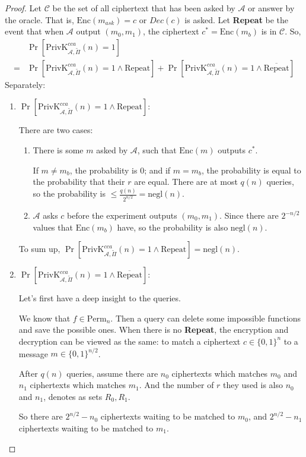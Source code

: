 \documentclass[12pt]{article}
\newcommand{\privk}{\text{PrivK}}
\newcommand{\negl}{\text{negl}}
\newcommand{\Enc}{\text{Enc}}
\newcommand{\Perm}{\text{Perm}}
\newcommand{\Repeat}{\text{Repeat}}
\newcommand{\C}{\mathcal{C}}
\newcommand{\A}{\mathcal{A}}
\newenvironment{problem}[2][Problem]{\begin{trivlist}
\item[\hskip \labelsep {\bfseries #1}\hskip \labelsep {\bfseries #2.}]}{\end{trivlist}}
\begin{document}
\begin{problem}{4.25}
\begin{proof}
Let $\C$ be the set of all ciphertext that has been asked by $\A$ or answer by the oracle. That is, $\Enc(m_{ask}) = c$ or $Dec(c)$ is asked. Let \textbf{Repeat} be the event that when $\A$ output $(m_0,m_1)$, the ciphertext $c^* = \Enc(m_b)$ is in $\C$. So,
\begin{align*}
    &\Pr[\privk_{\A,\widetilde{\Pi}}^{cca}(n)=1]\\
    =&\Pr[\privk_{\A,\widetilde{\Pi}}^{cca}(n)=1\land\Repeat]+\Pr[\privk_{\A,\widetilde{\Pi}}^{cca}(n)=1\land\overline{\Repeat}]
\end{align*}
Separately:
\begin{enumerate}
    \item $\Pr[\privk_{\A,\widetilde{\Pi}}^{cca}(n)=1\land\Repeat]$:\par
    There are two cases:
    \begin{enumerate}
        \item There is some $m$ asked by $\A$, such that $\Enc(m)$ outputs $c^*$. \par
        If $m\ne m_b$, the probability is $0$; and if $m=m_b$, the probability is equal to the probability that their $r$ are equal. There are at most $q(n)$ queries, so the probability is $\le\frac{q(n)}{2^{n/2}}=\negl(n)$.
        \item $\A$ asks $c$ before the experiment outputs $(m_0,m_1)$. Since there are $2^{-n/2}$ values that $\Enc(m_b)$ have, so the probability is also $\negl(n)$.
    \end{enumerate}
    To sum up, $\Pr[\privk_{\A,\widetilde{\Pi}}^{cca}(n)=1\land\Repeat]=\negl(n)$.
    \item $\Pr[\privk_{\A,\widetilde{\Pi}}^{cca}(n)=1\land\overline{\Repeat}]$:\par
    Let's first have a deep insight to the queries. \par We know that $f\in\Perm_n$. Then a query can delete some impossible functions and save the possible ones. When there is no \textbf{Repeat}, the encryption and decryption can be viewed as the same: to match a ciphertext $c\in\{0,1\}^{n}$ to a message $m\in\{0,1\}^{n/2}$. \par
    After $q(n)$ queries, assume there are $n_0$ ciphertexts which matches $m_0$ and $n_1$ ciphertexts which matches $m_1$. And the number of $r$ they used is also $n_0$ and $n_1$, denotes as sets $R_0,R_1$. \par
    So there are $2^{n/2}-n_0$ ciphertexts waiting to be matched to $m_0$, and $2^{n/2}-n_1$ ciphertexts waiting to be matched to $m_1$.\par
    

\end{enumerate}
\end{proof}
\end{problem}
\end{document}

